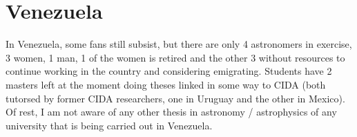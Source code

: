 \newpage
\section{Venezuela}

In Venezuela, some fans still subsist, but there are only 4 astronomers in exercise, 3 women, 1 man, 1 of the women is retired and the other 3 without resources to continue working in the country and considering emigrating. Students have 2 masters left at the moment doing theses linked in some way to CIDA (both tutorsed by former CIDA researchers, one in Uruguay and the other in Mexico). Of rest, I am not aware of any other thesis in astronomy / astrophysics of any university that is being carried out in Venezuela.